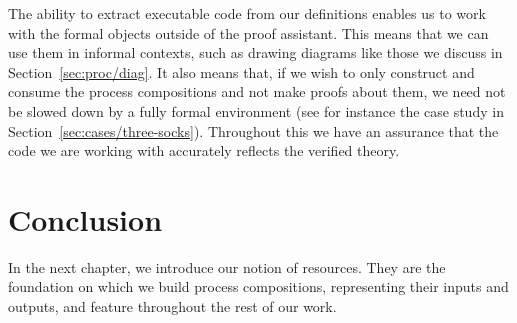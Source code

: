 \documentclass[class=smolathesis,crop=false]{standalone}
\begin{document}
The ability to extract executable code from our definitions enables us to work with the formal objects outside of the proof assistant.
This means that we can use them in informal contexts, such as drawing diagrams like those we discuss in Section~\ref{sec:proc/diag}.
It also means that, if we wish to only construct and consume the process compositions and not make proofs about them, we need not be slowed down by a fully formal environment (see for instance the case study in Section~\ref{sec:cases/three-socks}).
Throughout this we have an assurance that the code we are working with accurately reflects the verified theory.
\cbend

\section{Conclusion}
\label{sec:intro/conc}

In the next chapter, we introduce our notion of resources.
They are the foundation on which we build process compositions, representing their inputs and outputs, and feature throughout the rest of our work.

\ifstandalone


\fi
\end{document}
